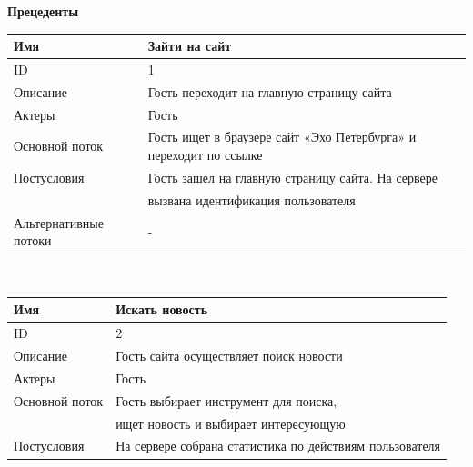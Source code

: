 \begin{center}
    \large
    \textbf{Прецеденты\\}
    \small
    \begin{tabular}{|l|l|}
        \hline
        Имя                   & Зайти на сайт                                                     \\
        \hline
        ID                    & 1                                                                 \\
        \hline
        Описание              & Гость переходит на главную страницу сайта                         \\
        \hline
        Актеры                & Гость                                                             \\
        \hline
        Основной поток        & Гость ищет в браузере сайт «Эхо Петербурга» и переходит по ссылке \\
        \hline
        Постусловия           & Гость зашел на главную страницу сайта. На сервере                 \\
        & вызвана идентификация пользователя                                \\
        \hline
        Альтернативные потоки & -                                                                 \\
        \hline
    \end{tabular}\\
    \vspace{0.5cm}
    \begin{tabular}{|l|l|}
        \hline
        Имя                   & Искать новость                                          \\
        \hline
        ID                    & 2                                                       \\
        \hline
        Описание              & Гость сайта осуществляет поиск новости                  \\
        \hline
        Актеры                & Гость                                                   \\
        \hline
        Основной поток        & Гость выбирает инструмент для поиска,                   \\
        & ищет новость и выбирает интересующую                    \\
        \hline
        Постусловия           & На сервере собрана статистика по действиям пользователя \\

\end{tabular}
\end{center}
